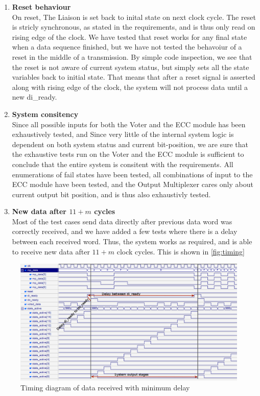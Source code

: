 \begin{enumerate}
    \item{\textbf{Reset behaviour}} \hfill\\
        On reset, The Liaison is set back to inital state on next clock cycle. The reset is stricly synchronous,
        as stated in the requirements\cite{task}, and is thus only read on rising edge of the clock. We have
        tested that reset works for any final state when a data sequence finished, but we have not tested the
        behavoiur of a reset in the middle of a transmission. By simple code inspection, we see that the
        reset is not aware of current system status, but simply sets all the state variables back to initial
        state. That means that after a reset signal is asserted along with rising edge of the clock, the system
        will not process data until a new {\ttfamily di\_ready}.

    \item{\textbf{System consitency}} \hfill\\
        Since all possible inputs for both the Voter and the ECC module has been exhaustively tested, and 
        Since very little of the internal system logic is dependent on both system status and current bit-position,
        we are sure that the exhaustive tests run on the Voter and the ECC module is sufficient to conclude that 
        the entire system is consitent with the requirements. All enumerations of fail states have been tested, all combinations
        of input to the ECC module have been tested, and the Output Multiplexer cares only about current output bit position,
        and is thus also exhaustivly tested.

    \item{\textbf{New data after $11+m$ cycles}} \hfill\\
        Most of the test cases send data directly after previous data word was correctly received, and we have
        added a few tests where there is a delay between each received word. Thus, the system works as required,
        and is able to receive new data after $11+m$ clock cycles. This is shown in \autoref{fig:timing}

\end{enumerate}

\begin{figure}
    \includegraphics[width=\textwidth]{tests/timing}
    \caption{Timing diagram of data received with minimum delay}
    \label{fig:timing}
\end{figure}
